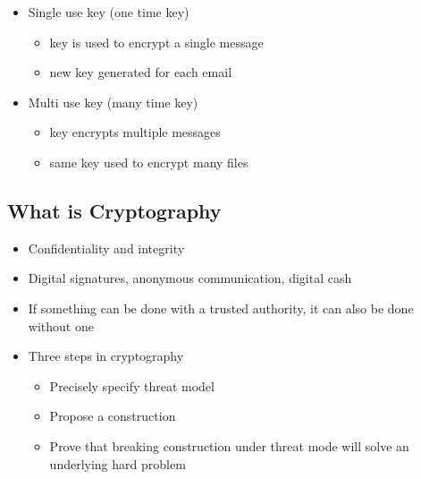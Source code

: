 \documentclass[]{article}
\begin{document}
\begin{itemize}
	\begin{itemize}
		\item Single use key (one time key)
		\begin{itemize}
			\item key is used to encrypt a single message
			\item new key generated for each email
		\end{itemize}
		\item Multi use key (many time key)
		\begin{itemize}
			\item key encrypts multiple messages
			\item same key used to encrypt many files
		\end{itemize}
	\end{itemize}
\end{itemize}
\subsection{What is Cryptography}
\begin{itemize}
	\item Confidentiality and integrity
	\item Digital signatures, anonymous communication, digital cash
	\item If something can be done with a trusted authority, it can also be done without one
	\item Three steps in cryptography
	\begin{itemize}
		\item Precisely specify threat model
		\item Propose a construction
		\item Prove that breaking construction under threat mode will solve an underlying hard problem
	\end{itemize}
\end{itemize}
\end{document}
